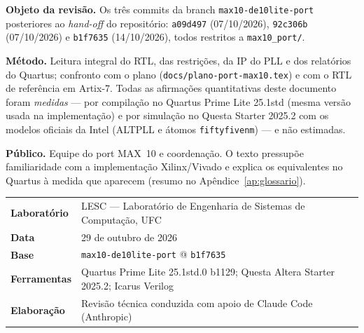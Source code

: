 \documentclass[11pt,a4paper]{article}
\newcommand{\file}[1]{\texttt{\small #1}}
\begin{document}
\begin{titlepage}
\thispagestyle{empty}
\vspace*{1.2cm}
\noindent{\color{rulegray}\rule{\textwidth}{1.2pt}}
\vspace{0.9cm}


\vspace{0.7cm}

\vspace{0.5cm}
\noindent{\color{rulegray}\rule{\textwidth}{1.2pt}}
\vspace{1.2cm}

\noindent\begin{tcolorbox}[enhanced,colback=lesclight,colframe=lescaccent,boxrule=0.4pt,
  left=12pt,right=12pt,top=10pt,bottom=10pt,arc=2pt]
\small
\textbf{Objeto da revisão.} Os três commits da branch \texttt{max10-de10lite-port}
posteriores ao \emph{hand-off} do repositório: \texttt{a09d497} (07/10/2026),
\texttt{92c306b} (07/10/2026) e \texttt{b1f7635} (14/10/2026), todos restritos a
\texttt{max10\_port/}.

\vspace{5pt}
\textbf{Método.} Leitura integral do RTL, das restrições, da IP do PLL e dos relatórios
do Quartus; confronto com o plano (\file{docs/plano-port-max10.tex}) e com o RTL de
referência em Artix-7. Todas as afirmações quantitativas deste documento foram
\emph{medidas} --- por compilação no Quartus Prime Lite 25.1std (mesma versão usada na
implementação) e por simulação no Questa Starter 2025.2 com os modelos oficiais da Intel
(ALTPLL e átomos \texttt{fiftyfivenm}) --- e não estimadas.

\vspace{5pt}
\textbf{Público.} Equipe do port MAX~10 e coordenação. O texto pressupõe familiaridade
com a implementação Xilinx/Vivado e explica os equivalentes no Quartus à medida que
aparecem (resumo no Apêndice~\ref{ap:glossario}).
\end{tcolorbox}

\vfill
\noindent\begin{tabularx}{\textwidth}{@{}lX@{}}
\toprule
\textbf{Laboratório} & LESC --- Laboratório de Engenharia de Sistemas de Computação, UFC \\
\textbf{Data} & 29 de outubro de 2026 \\
\textbf{Base} & \texttt{max10-de10lite-port} @ \texttt{b1f7635} \\
\textbf{Ferramentas} & Quartus Prime Lite 25.1std.0 b1129; Questa Altera Starter 2025.2; Icarus Verilog \\
\textbf{Elaboração} & Revisão técnica conduzida com apoio de Claude Code (Anthropic) \\
\bottomrule
\end{tabularx}
\vspace{0.8cm}
\noindent{\color{rulegray}\rule{\textwidth}{0.8pt}}
\end{titlepage}
\end{document}

